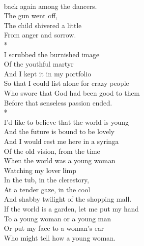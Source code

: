 \documentclass[smalldemyvopaper,11pt,twoside,onecolumn,openright,extrafontsizes]{memoir}
\begin{document}
\\back again among the dancers.
\\The gun went off,
\\The child shivered a little
\\From anger and sorrow.
\\*
\\I scrubbed the burnished image
\\Of the youthful martyr
\\And I kept it in my portfolio
\\So that I could list alone for crazy people
\\Who swore that God had been good to them
\\Before that senseless passion ended.
\\*
\\I'd like to believe that the world is young
\\And the future is bound to be lovely
\\And I would rest me here in a syringa
\\Of the old vision, from the time
\\When the world was a young woman
\\Watching my lover limp
\\In the tub, in the clerestory,
\\At a tender gaze, in the cool
\\And shabby twilight of the shopping mall.
\\If the world is a garden, let me put my hand
\\To a young woman or a young man
\\Or put my face to a woman's ear
\\Who might tell how a young woman.
\end{document}
